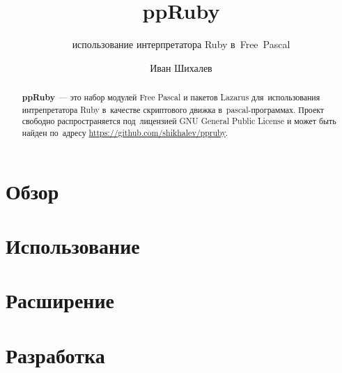 \documentclass[a4paper,10pt,DIVcalc,final]{scrartcl}
\author{Иван Шихалев}
\title{ppRuby}
\subtitle{использование интерпретатора Ruby в Free Pascal}
\begin{document}
\maketitle

\begin{abstract}
\noindent\textsf{\textbf{ppRuby}} — это набор модулей Free Pascal и пакетов 
Lazarus для ис\-поль\-зо\-ва\-ния интрепретатора Ruby в качестве скриптового 
движка в pascal-программах.
Проект свободно распространяется под лицензией GNU General Public License и 
может быть найден по адресу \url{https://github.com/shikhalev/ppruby}.
\end{abstract}

\tableofcontents

\section{Обзор}

\section{Использование}

\section{Расширение}

\section{Разработка}
\end{document}
